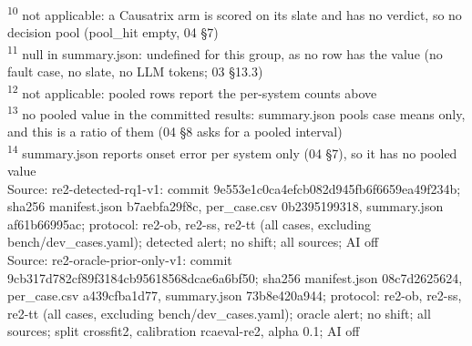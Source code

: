 \begin{table}[t]
\textsuperscript{10} not applicable: a Causatrix arm is scored on its slate and has no verdict, so no decision pool (pool\_hit empty, 04 \S{}7)\\
\textsuperscript{11} null in summary.json: undefined for this group, as no row has the value (no fault case, no slate, no LLM tokens; 03 \S{}13.3)\\
\textsuperscript{12} not applicable: pooled rows report the per-system counts above\\
\textsuperscript{13} no pooled value in the committed results: summary.json pools case means only, and this is a ratio of them (04 \S{}8 asks for a pooled interval)\\
\textsuperscript{14} summary.json reports onset error per system only (04 \S{}7), so it has no pooled value\\
Source: re2-detected-rq1-v1: commit 9e553e1c0ca4efcb082d945fb6f6659ea49f234b; sha256 manifest.json b7aebfa29f8c, per\_case.csv 0b2395199318, summary.json af61b66995ac; protocol: re2-ob, re2-ss, re2-tt (all cases, excluding bench/dev\_cases.yaml); detected alert; no shift; all sources; AI off\\
Source: re2-oracle-prior-only-v1: commit 9cb317d782cf89f3184cb95618568dcae6a6bf50; sha256 manifest.json 08c7d2625624, per\_case.csv a439cfba1d77, summary.json 73b8e420a944; protocol: re2-ob, re2-ss, re2-tt (all cases, excluding bench/dev\_cases.yaml); oracle alert; no shift; all sources; split crossfit2, calibration rcaeval-re2, alpha 0.1; AI off\\
\end{table}
